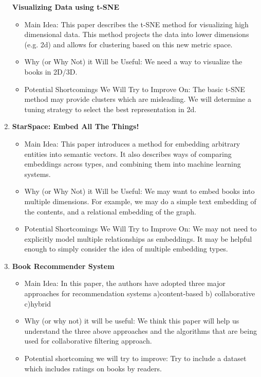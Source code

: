 \begin{enumerate}[label=(\arabic*)]
    \textbf{Visualizing Data using t-SNE}
    \begin{itemize}
        \item Main Idea: This paper describes the t-SNE method for visualizing high dimensional data. This method projects the data into lower dimensions (e.g. 2d) and allows for clustering based on this new metric space.
        \item Why (or Why Not) it Will be Useful: We need a way to visualize the books in 2D/3D.
        \item  Potential Shortcomings We Will Try to Improve On: The basic t-SNE method may provide clusters which are misleading. We will determine a tuning strategy to select the best representation in 2d.
    \end{itemize}
    \item
    \cite{wu2018starspace}
    \textbf{StarSpace:
Embed All The Things!}
    \begin{itemize}
        \item Main Idea: This paper introduces a method for embedding arbitrary entities into semantic vectors. It also describes ways of comparing embeddings across types, and combining them into machine learning systems.
        \item Why (or Why Not) it Will be Useful: We may want to embed books into multiple dimensions. For example, we may do a simple text embedding of the contents, and a relational embedding of the graph.
        \item Potential Shortcomings We Will Try to Improve On: We may not need to explicitly model multiple relationships as embeddings. It may be helpful enough to simply consider the idea of multiple embedding types.
    \end{itemize}
    \item \cite{cho2016book} \textbf{Book Recommender System}
    \begin{itemize}
        \item Main Idea: In this paper, the authors have adopted three major approaches for recommendation systems a)content-based b) collaborative c)hybrid
        \item Why (or why not) it will be useful: We think this paper will help us understand the three above approaches and the algorithms that are being used for collaborative filtering approach.
        \item Potential shortcoming we will try to improve: Try to  include a dataset which includes ratings on books by readers.
    \end{itemize}

\end{enumerate}
